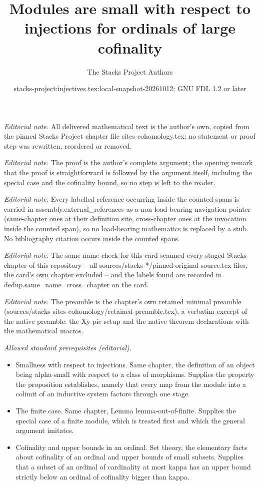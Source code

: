 \documentclass[10pt,a4paper]{amsart}
\title{Modules are small with respect to injections for ordinals of large cofinality}
\author{The Stacks Project Authors}
\date{stacks-project:injectives.tex:local-snapshot-20261012; GNU FDL 1.2 or later}
\theoremstyle{plain}
\theoremstyle{definition}
\theoremstyle{remark}
\numberwithin{equation}{subsection}
\begin{document}
\maketitle
\noindent\textit{Editorial note.} All delivered mathematical text is the author's own, copied from the pinned Stacks Project chapter file sites-cohomology.tex; no statement or proof step was rewritten, reordered or removed.\par\medskip
\noindent\textit{Editorial note.} The proof is the author's complete argument; the opening remark that the proof is straightforward is followed by the argument itself, including the special case and the cofinality bound, so no step is left to the reader.\par\medskip
\noindent\textit{Editorial note.} Every labelled reference occurring inside the counted spans is carried in assembly.external\_references as a non-load-bearing navigation pointer (same-chapter ones at their definition site, cross-chapter ones at the invocation inside the counted span), so no load-bearing mathematics is replaced by a stub. No bibliography citation occurs inside the counted spans.\par\medskip
\noindent\textit{Editorial note.} The same-name check for this card scanned every staged Stacks chapter of this repository -- all sources/stacks-*/pinned-original-source.tex files, the card's own chapter excluded -- and the labels found are recorded in dedup.same\_name\_cross\_chapter on the card.\par\medskip
\noindent\textit{Editorial note.} The preamble is the chapter's own retained minimal preamble (sources/stacks-sites-cohomology/retained-preamble.tex), a verbatim excerpt of the native preamble: the Xy-pic setup and the native theorem declarations with the mathematical macros.\par\medskip
\noindent\textit{Allowed standard prerequisites (editorial).}\begin{itemize}
\item Smallness with respect to injections. Same chapter, the definition of an object being alpha-small with respect to a class of morphisms. Supplies the property the proposition establishes, namely that every map from the module into a colimit of an inductive system factors through one stage.
\item The finite case. Same chapter, Lemma lemma-out-of-finite. Supplies the special case of a finite module, which is treated first and which the general argument imitates.
\item Cofinality and upper bounds in an ordinal. Set theory, the elementary facts about cofinality of an ordinal and upper bounds of small subsets. Supplies that a subset of an ordinal of cardinality at most kappa has an upper bound strictly below an ordinal of cofinality bigger than kappa.
\end{itemize}\medskip
\end{document}
